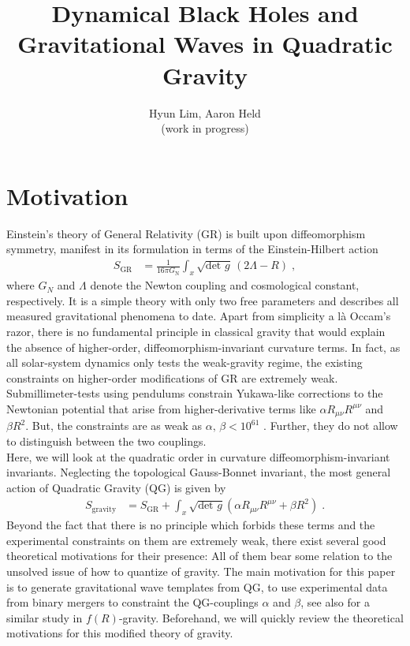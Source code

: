 \documentclass[a4paper,oneside,openany,11pt]{memoir}
\numberwithin{equation}{section} %
\begin{document}
\title{\HUGE Dynamical Black Holes and Gravitational Waves in Quadratic Gravity}

\author{Hyun Lim, Aaron Held\\(work in progress)}


\maketitle


\section{Motivation}

Einstein's theory of General Relativity (GR) is built upon diffeomorphism symmetry, manifest in its formulation in terms of the Einstein-Hilbert action
\begin{align}
    S_{\text{GR}} &=
 \frac1{16\pi G_\text{N}}\int_x \sqrt{\text{det } g}\, (2\Lambda-R)\;,
\end{align}
where $G_N$ and $\Lambda$ denote the Newton coupling and cosmological constant, respectively. It is a simple theory with only two free parameters and describes all measured gravitational phenomena to date. Apart from simplicity a l\`a Occam's razor, there is no fundamental principle in classical gravity that would explain the absence of higher-order, diffeomorphism-invariant curvature terms. In fact, as all solar-system dynamics only tests the weak-gravity regime, the existing constraints on higher-order modifications of GR are extremely weak. Submillimeter-tests using pendulums constrain Yukawa-like corrections to the Newtonian potential that arise from higher-derivative terms like $\alpha  R_{\mu\nu}R^{\mu\nu}$ and $\beta  R^2$. But, the constraints are as weak as $\alpha,\,\beta < 10^{61}$ \cite{Hoyle:2004cw, Kapner:2006si, Calmet:2017rxl}. Further, they do not allow to distinguish between the two couplings.
\\
Here, we will look at the quadratic order in curvature diffeomorphism-invariant invariants. Neglecting the topological Gauss-Bonnet invariant, the most general action of Quadratic Gravity (QG) is given by
\begin{align}
    S_{\text{gravity}} &=
 S_\text{GR}
 + \int_x \sqrt{\text{det }g} \left(\alpha  R_{\mu\nu}R^{\mu\nu} + \beta  R^2\right)  \;. 
\end{align}
Beyond the fact that there is no principle which forbids these terms and the experimental constraints on them are extremely weak, there exist several good theoretical motivations for their presence: All of them bear some relation to the unsolved issue of how to quantize of gravity. The main motivation for this paper is to generate gravitational wave templates from QG, to use experimental data from binary mergers to constraint the QG-couplings $\alpha$ and $\beta$, see also \cite{Berry:2011pb, Cao:2013osa} for a similar study in $f(R)$-gravity. Beforehand, we will quickly review the theoretical motivations for this modified theory of gravity.
\end{document}
